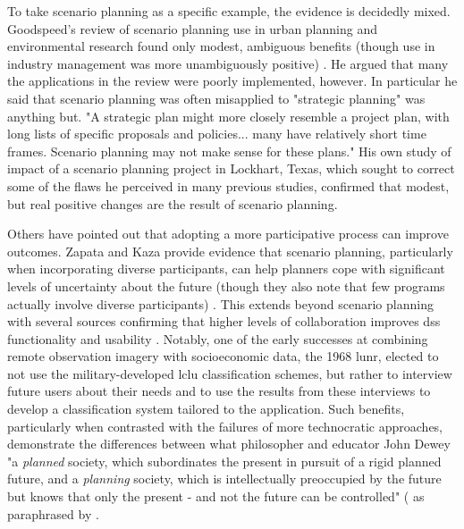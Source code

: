 To take scenario planning as a specific example, the evidence is decidedly mixed. Goodspeed's review of scenario planning use in urban planning and environmental research found only modest, ambiguous benefits (though use in industry management was more unambiguously positive) \cite{goodspeedScenarioPlanningCities2020}. He argued that many the applications in the review were poorly implemented, however. In particular he said that scenario planning was often misapplied to "strategic planning" was anything but. "A strategic plan might more closely resemble a project plan, with long lists of specific proposals and policies... many have relatively short time frames. Scenario planning may not make sense for these plans." His own study of impact of a scenario planning project in Lockhart, Texas, which sought to correct some of the flaws he perceived in many previous studies, confirmed that modest, but real positive changes are the result of scenario planning.

Others have pointed out that adopting a more participative process can improve outcomes. Zapata and Kaza provide evidence that scenario planning, particularly when incorporating diverse participants, can help planners cope with significant levels of uncertainty about the future (though they also note that few programs actually involve diverse participants) \cite{zapataRadicalUncertaintyScenario2015}. This extends beyond scenario planning with several sources confirming that higher levels of collaboration improves \ac{dss} functionality and usability \cite{goodspeedDeathLifeCollaborative2016, vonkSociotechnicalPSSDevelopment2010, brommelstroetPlanningSupportSystems2010, ulibarriCollaborativeModelDevelopment2018}. Notably, one of the early successes at combining remote observation imagery with socioeconomic data, the 1968 \ac{lunr}, elected to not use the military-developed \ac{lclu} classification schemes, but rather to interview future users about their needs and to use the results from these interviews to develop a classification system tailored to the application. Such benefits, particularly when contrasted with the failures of more technocratic approaches, demonstrate the differences between what philosopher and educator John Dewey "a \textit{planned} society, which subordinates the present in pursuit of a rigid planned future, and a \textit{planning} society, which is intellectually preoccupied by the future but knows that only the present - and not the future can be controlled" (\cite{deweyHumanNatureConduct2007} as paraphrased by \cite{goodspeedScenarioPlanningCities2020}.

